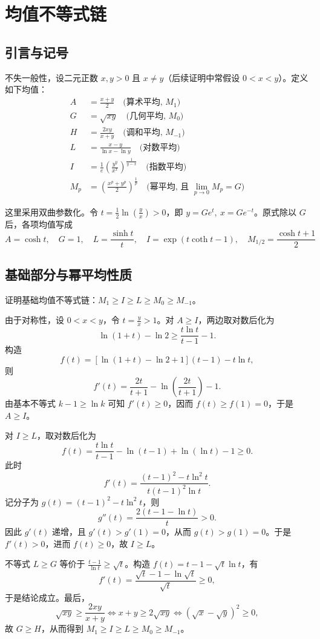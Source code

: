\chapter{均值不等式链}

\section{引言与记号}
不失一般性，设二元正数 $x, y > 0$ 且 $x \neq y$（后续证明中常假设 $0 < x < y$）。定义如下均值：
\begin{align*}
    A &= \frac{x+y}{2} \quad \text{(算术平均, } M_1 \text{)} \\
    G &= \sqrt{xy} \quad \text{(几何平均, } M_0 \text{)} \\
    H &= \frac{2xy}{x+y} \quad \text{(调和平均, } M_{-1} \text{)} \\
    L &= \frac{x-y}{\ln x - \ln y} \quad \text{(对数平均)} \\
    I &= \frac{1}{e}\left(\frac{y^y}{x^x}\right)^{\frac{1}{y-x}} \quad \text{(指数平均)} \\
    M_p &= \left(\frac{x^p+y^p}{2}\right)^{\frac{1}{p}} \quad \text{(幂平均, 且 } \lim_{p\to 0}M_p = G \text{)}
\end{align*}

这里采用双曲参数化。令 $t = \frac{1}{2}\ln\left(\frac{y}{x}\right) > 0$，即 $y = G e^t,\ x = G e^{-t}$。原式除以 $G$ 后，各项均值写成
\[
A = \cosh t, \quad G = 1, \quad L = \frac{\sinh t}{t}, \quad I = \exp(t\coth t - 1), \quad M_{1/2} = \frac{\cosh t + 1}{2}
\]

\section{基础部分与幂平均性质}

\begin{example}
证明基础均值不等式链：$M_1 \ge I \ge L \ge M_0 \ge M_{-1}$。
\end{example}
\begin{solution}
由于对称性，设 $0 < x < y$，令 $t = \frac{y}{x} > 1$。对 $A \ge I$，两边取对数后化为
\[
\ln(1+t) - \ln 2 \ge \frac{t\ln t}{t-1} - 1.
\]
构造
\[
f(t) = [\ln(1+t)-\ln 2+1](t-1) - t\ln t,
\]
则
\[
f'(t) = \frac{2t}{t+1} - \ln\left(\frac{2t}{t+1}\right) - 1.
\]
由基本不等式 $k-1 \ge \ln k$ 可知 $f'(t) \ge 0$，因而 $f(t) \ge f(1) = 0$，于是 $A \ge I$。

对 $I \ge L$，取对数后化为
\[
f(t) = \frac{t\ln t}{t-1} - \ln(t-1) + \ln(\ln t) - 1 \ge 0.
\]
此时
\[
f'(t) = \frac{(t-1)^2 - t\ln^2 t}{t(t-1)^2\ln t}.
\]
记分子为 $g(t) = (t-1)^2 - t\ln^2 t$，则
\[
g''(t) = \frac{2(t-1-\ln t)}{t} > 0.
\]
因此 $g'(t)$ 递增，且 $g'(t) > g'(1) = 0$，从而 $g(t) > g(1) = 0$。于是 $f'(t) > 0$，进而 $f(t) \ge 0$，故 $I \ge L$。

不等式 $L \ge G$ 等价于 $\frac{t-1}{\ln t} \ge \sqrt{t}$。构造 $f(t) = t - 1 - \sqrt{t}\ln t$，有
\[
f'(t) = \frac{\sqrt{t}-1-\ln\sqrt{t}}{\sqrt{t}} \ge 0,
\]
于是结论成立。最后，
\[
\sqrt{xy} \ge \frac{2xy}{x+y} \iff x+y \ge 2\sqrt{xy} \iff (\sqrt{x}-\sqrt{y})^2 \ge 0,
\]
故 $G \ge H$，从而得到 $M_1 \ge I \ge L \ge M_0 \ge M_{-1}$。
\end{solution}

